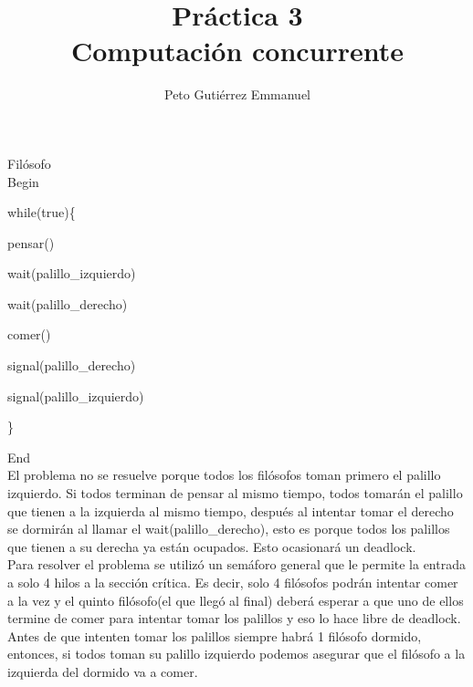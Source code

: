 \documentclass{article}
\title{Práctica 3\\Computación concurrente}
\author{Peto Gutiérrez Emmanuel}
\begin{document}
\maketitle
Filósofo \\

Begin

\hspace{0.5cm}while(true)\{

\hspace{1cm}pensar()

\hspace{1cm}wait(palillo\_izquierdo)

\hspace{1cm}wait(palillo\_derecho)

\hspace{1cm}comer()

\hspace{1cm}signal(palillo\_derecho)

\hspace{1cm}signal(palillo\_izquierdo)

\hspace{0.5cm}\}

End \\

El problema no se resuelve porque todos los filósofos toman primero el palillo izquierdo. Si todos terminan de pensar al mismo tiempo, todos tomarán el palillo que tienen a la izquierda al mismo tiempo, después al intentar tomar el derecho se dormirán al llamar el wait(palillo\_derecho), esto es porque todos los palillos que tienen a su derecha ya están ocupados. Esto ocasionará un deadlock. \\

Para resolver el problema se utilizó un semáforo general que le permite la entrada a solo 4 hilos a la sección crítica. Es decir, solo 4 filósofos podrán intentar comer a la vez y el quinto filósofo(el que llegó al final) deberá esperar a que uno de ellos termine de comer para intentar tomar los palillos y eso lo hace libre de deadlock. Antes de que intenten tomar los palillos siempre habrá 1 filósofo dormido, entonces, si todos toman su palillo izquierdo podemos asegurar que el filósofo a la izquierda del dormido va a comer.
\end{document}
